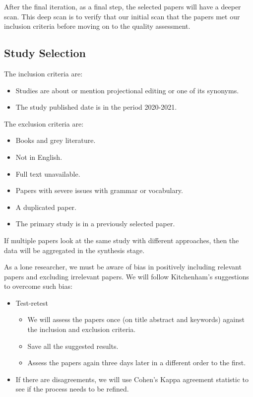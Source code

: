 After the final iteration, as a final step, the selected papers will have a deeper scan.
This deep scan is to verify that our initial scan that the papers met our inclusion criteria before moving on to the quality assessment.

\subsection{Study Selection}

The inclusion criteria are:
\begin{itemize}
       \item Studies are about or mention projectional editing or one of its synonyms.
       \item The study published date is in the period 2020-2021.
\end{itemize}

The exclusion criteria are:
\begin{itemize}
       \item Books and grey literature.
       \item Not in English.
       \item Full text unavailable.
       \item Papers with severe issues with grammar or vocabulary.
       \item A duplicated paper.
       \item The primary study is in a previously selected paper.
\end{itemize}

If multiple papers look at the same study with different approaches, then the data will be aggregated in the synthesis stage.

As a lone researcher, we must be aware of bias in positively including relevant papers and excluding irrelevant papers.
We will follow Kitchenham's suggestions to overcome such bias:
\begin{itemize}
       \item Test-retest 
       \begin{itemize}
              \item We will assess the papers once (on title abstract and keywords) against the inclusion and exclusion criteria.
              \item Save all the suggested results.
              \item Assess the papers again three days later in a different order to the first.  
       \end{itemize}
       \item If there are disagreements, we will use Cohen's Kappa agreement statistic\cite{Cohen_1960} to see if the process needs to be refined.
\end{itemize} 

